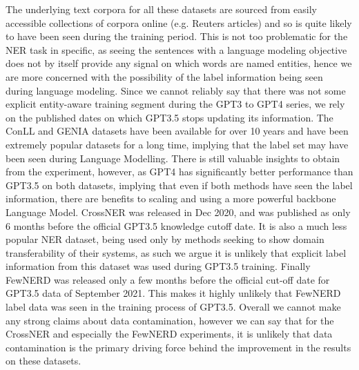 \documentclass[11pt]{article}
\begin{document}
The underlying text corpora for all these datasets are sourced from easily accessible collections of corpora online (e.g. Reuters articles) and so is quite likely to have been seen during the training period. This is not too problematic for the NER task in specific, as seeing the sentences with a language modeling objective does not by itself provide any signal on which words are named entities, hence we are more concerned with the possibility of the label information being seen during language modeling. Since we cannot reliably say that there was not some explicit entity-aware training segment during the GPT3 to GPT4 series, we rely on the published dates on which GPT3.5 stops updating its information. The ConLL and GENIA datasets have been available for over 10 years and have been extremely popular datasets for a long time, implying that the label set may have been seen during Language Modelling. There is still valuable insights to obtain from the experiment, however, as GPT4 has significantly better performance than GPT3.5 on both datasets, implying that even if both methods have seen the label information, there are benefits to scaling and using a more powerful backbone Language Model. CrossNER was released in Dec 2020, and was published as \citet{liu2021crossner} only 6 months before the official GPT3.5 knowledge cutoff date. It is also a much less popular NER dataset, being used only by methods seeking to show domain transferability of their systems, as such we argue it is unlikely that explicit label information from this dataset was used during GPT3.5 training. Finally FewNERD was released only a few months before the official cut-off date for GPT3.5 data of September 2021. This makes it highly unlikely that FewNERD label data was seen in the training process of GPT3.5. Overall we cannot make any strong claims about data contamination, however we can say that for the CrossNER and especially the FewNERD experiments, it is unlikely that data contamination is the primary driving force behind the improvement in the results on these datasets.  
\end{document}
